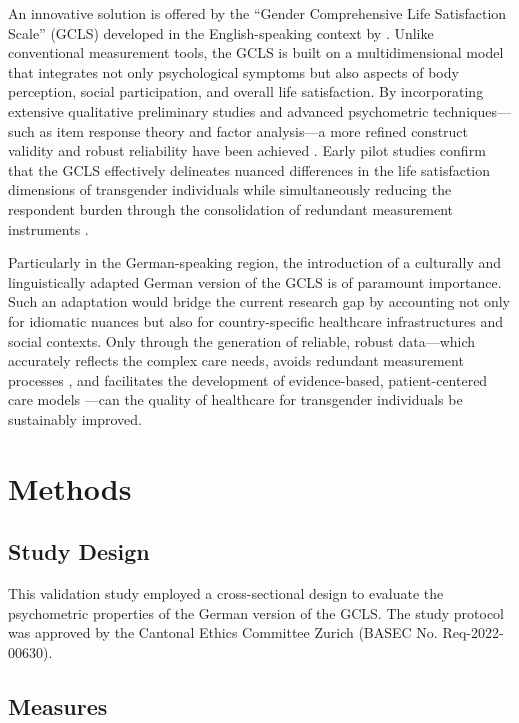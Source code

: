 \documentclass[12pt,a4paper]{article}
\begin{document}
An innovative solution is offered by the ``Gender Comprehensive Life Satisfaction Scale'' (GCLS) developed in the English-speaking context by \textcite{Jones2016}. Unlike conventional measurement tools, the GCLS is built on a multidimensional model that integrates not only psychological symptoms but also aspects of body perception, social participation, and overall life satisfaction. By incorporating extensive qualitative preliminary studies and advanced psychometric techniques---such as item response theory and factor analysis---a more refined construct validity and robust reliability have been achieved \parencite{Jones2016, Marshall2016}. Early pilot studies confirm that the GCLS effectively delineates nuanced differences in the life satisfaction dimensions of transgender individuals while simultaneously reducing the respondent burden through the consolidation of redundant measurement instruments \parencite{Dawson2010, Lawer2002}.

Particularly in the German-speaking region, the introduction of a culturally and linguistically adapted German version of the GCLS is of paramount importance. Such an adaptation would bridge the current research gap by accounting not only for idiomatic nuances but also for country-specific healthcare infrastructures and social contexts. Only through the generation of reliable, robust data---which accurately reflects the complex care needs, avoids redundant measurement processes \parencite{Rolstad2011, Turner2007}, and facilitates the development of evidence-based, patient-centered care models \parencite{Richards2016, Bouman2013}---can the quality of healthcare for transgender individuals be sustainably improved.

\section{Methods}

\subsection{Study Design}

This validation study employed a cross-sectional design to evaluate the psychometric properties of the German version of the GCLS. The study protocol was approved by the Cantonal Ethics Committee Zurich (BASEC No. Req-2022-00630).

\subsection{Measures}
\end{document}
